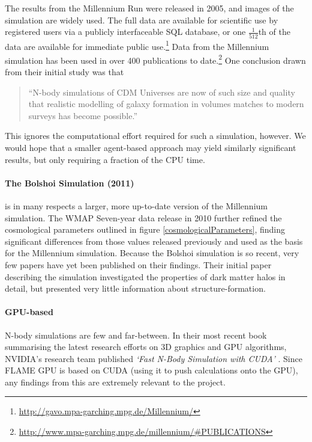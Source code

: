 \documentclass[11pt,a4paper]{article}
\begin{document}
The results from the Millennium Run were released in 2005, and images of the simulation are widely used. The full data are available for scientific use by registered users via a publicly interfaceable SQL database, or one $\frac{1}{512}$th of the data are available for immediate public use.\footnote{\url{http://gavo.mpa-garching.mpg.de/Millennium/}} Data from the Millennium simulation has been used in over 400 publications to date.\footnote{\url{http://www.mpa-garching.mpg.de/millennium/\#PUBLICATIONS}} One conclusion drawn from their initial study was that \begin{quotation}\noindent``N-body simulations of CDM Universes are now of such size and quality that realistic modelling of galaxy formation in volumes matches to modern surveys has become possible.'' \end{quotation} This ignores the computational effort required for such a simulation, however. We would hope that a smaller agent-based approach may yield similarly significant results, but only requiring a fraction of the CPU time. 

\paragraph{The Bolshoi Simulation (2011)} \cite{bolshoi} is in many respects a larger, more up-to-date version of the Millennium simulation. The WMAP Seven-year data release in 2010 \cite{sevenYWmap} further refined the cosmological parameters outlined in figure \ref{cosmologicalParameters}, finding significant differences from those values released previously and used as the basis for the Millennium simulation. Because the Bolshoi simulation is so recent, very few papers have yet been published on their findings. Their initial paper describing the simulation investigated the properties of dark matter halos in detail, but presented very little information about structure-formation.

\paragraph{GPU-based}
N-body simulations are few and far-between. In their most recent book summarising the latest research efforts on 3D graphics and GPU algorithms, NVIDIA's research team published \emph{`Fast N-Body Simulation with CUDA'} \cite{gems}. Since FLAME GPU is based on CUDA (using it to push calculations onto the GPU), any findings from this are extremely relevant to the project. 
\end{document}
